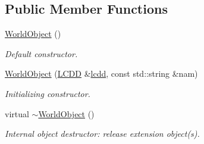 \subsection*{Public Member Functions}
\begin{Indent}{\bf }\par
{\em \label{_amgrpd41d8cd98f00b204e9800998ecf8427e}
 }\begin{DoxyCompactItemize}
\item 
\hyperlink{class_d_d4hep_1_1_geometry_1_1_world_object_a69331daf3614dc0e3a5f7ff37164c8ef}{WorldObject} ()
\begin{DoxyCompactList}\small\item\em Default constructor. \item\end{DoxyCompactList}\item 
\hyperlink{class_d_d4hep_1_1_geometry_1_1_world_object_af5a61cf32fba3494a3dca40bb1cdb235}{WorldObject} (\hyperlink{class_d_d4hep_1_1_geometry_1_1_l_c_d_d}{LCDD} \&\hyperlink{class_d_d4hep_1_1_geometry_1_1_world_object_a72d88491949f298897e034e2e5bc74df}{lcdd}, const std::string \&nam)
\begin{DoxyCompactList}\small\item\em Initializing constructor. \item\end{DoxyCompactList}\item 
virtual \hyperlink{class_d_d4hep_1_1_geometry_1_1_world_object_a287e5b87a26133cd35f3015268d2a5a3}{$\sim$WorldObject} ()
\begin{DoxyCompactList}\small\item\em Internal object destructor: release extension object(s). \item\end{DoxyCompactList}\end{DoxyCompactItemize}
\end{Indent}
